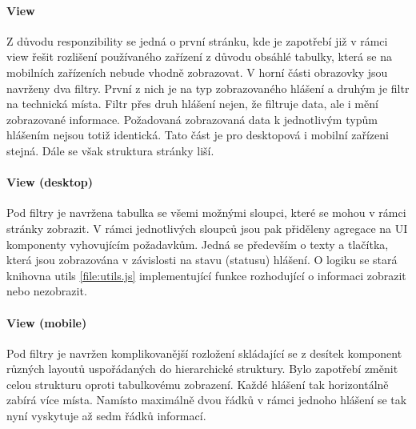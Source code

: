 \documentclass[thesis=M,czech]{FITthesis}[2012/06/26]
\begin{document}
\paragraph{View}
Z důvodu responzibility se jedná o první stránku, kde je zapotřebí již v rámci view řešit rozlišení používaného zařízení z důvodu obsáhlé tabulky, která se na mobilních zařízeních nebude vhodně zobrazovat. V horní části obrazovky jsou navrženy dva filtry. První z nich je na typ zobrazovaného hlášení a druhým je filtr na technická místa. Filtr přes druh hlášení nejen, že filtruje data, ale i mění zobrazované informace. Požadovaná zobrazovaná data k jednotlivým typům hlášením nejsou totiž identická. Tato část je pro desktopová i mobilní zařízeni stejná. Dále se však struktura stránky liší. 
\paragraph{View (desktop)}
Pod filtry je navržena tabulka se všemi možnými sloupci, které se mohou v rámci stránky zobrazit. V rámci jednotlivých sloupců jsou pak přiděleny agregace na UI komponenty vyhovujícím požadavkům. Jedná se především o texty a tlačítka, která jsou zobrazována v závislosti na stavu (statusu) hlášení. O logiku se stará knihovna utils \ref{file:utils.js} implementující funkce rozhodující o informaci zobrazit nebo nezobrazit.
\paragraph{View (mobile)}
Pod filtry je navržen komplikovanější rozložení skládající se z desítek komponent různých layoutů uspořádaných do hierarchické struktury. Bylo zapotřebí změnit celou strukturu oproti tabulkovému zobrazení. Každé hlášení tak horizontálně zabírá více místa. Namísto maximálně dvou řádků v rámci jednoho hlášení se tak nyní vyskytuje až sedm řádků informací.
\end{document}
